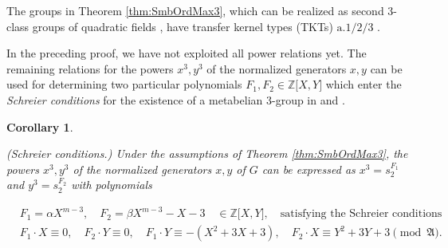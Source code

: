 \documentclass{amsart}
\newtheorem{corollary}{Corollary}[section]
\theoremstyle{definition}
\numberwithin{equation}{section}
\begin{document}
\noindent
The groups in Theorem
\ref{thm:SmbOrdMax3},
which can be realized as second \(3\)-class groups of quadratic fields
\cite{Ma4},
have transfer kernel types (TKTs) \(\mathrm{a.1/2/3}\)
\cite{Ma2}.


In the preceding proof, we have not exploited all power relations yet.
The remaining relations for the powers \(x^3,y^3\) of the normalized generators \(x,y\)
can be used for determining two particular polynomials \(F_1,F_2\in\mathbb{Z}\lbrack X,Y\rbrack\)
which enter the \textit{Schreier conditions} for the existence of a metabelian \(3\)-group in
\cite[\S\ 3, Satz III]{Sr1}
and
\cite[pp. 321--322, and Satz 1, p. 325]{Sr2}.

\begin{corollary}
\label{cor:SchreierRelMax3}

(Schreier conditions.)
Under the assumptions of Theorem
\ref{thm:SmbOrdMax3},
the powers \(x^3,y^3\) of the normalized generators \(x,y\) of \(G\)
can be expressed as \(x^3=s_2^{F_1}\) and \(y^3=s_2^{F_2}\)
with polynomials

\begin{equation}
\label{eqn:SchreierRelMax3}
\begin{aligned}
 & F_1=\alpha X^{m-3}, \quad F_2=\beta X^{m-3}-X-3 \quad \in\mathbb{Z}\lbrack X,Y\rbrack, \quad
 \text{satisfying the Schreier conditions} \\
 & F_1\cdot X\equiv 0, \quad F_2\cdot Y\equiv 0, \quad F_1\cdot Y\equiv -(X^2+3X+3), \quad F_2\cdot X\equiv Y^2+3Y+3 \pmod{\mathfrak{A}}.
\end{aligned}
\end{equation}

\end{corollary}
\end{document}
